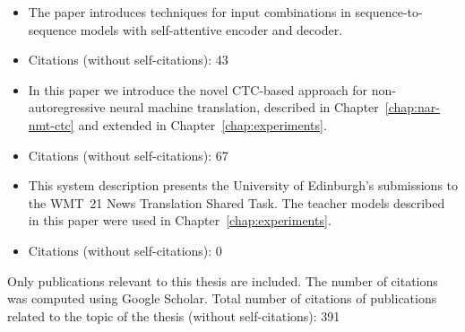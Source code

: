 \noindent{}
\begin{itemize}[noitemsep,topsep=0pt]

\item The paper introduces techniques for input combinations in
  sequence-to-sequence models with self-attentive encoder and decoder.

\item Citations (without self-citations): 43
\end{itemize}\vspace{3mm}

\noindent{}
\begin{itemize}[noitemsep,topsep=0pt]

\item In this paper we introduce the novel CTC-based approach for
  non-autoregressive neural machine translation, described in
  Chapter~\ref{chap:nar-nmt-ctc} and extended in
  Chapter~\ref{chap:experiments}.

\item Citations (without self-citations): 67
\end{itemize}\vspace{3mm}

\noindent{}
\begin{itemize}[noitemsep,topsep=0pt]

\item This system description presents the University of Edinburgh's
  submissions to the WMT~21 News Translation Shared Task. The teacher models
  described in this paper were used in Chapter~\ref{chap:experiments}.

\item Citations (without self-citations): 0 
\end{itemize}\vspace{3mm}

\vfill

\noindent Only publications relevant to this thesis are included. The number of
citations was computed using Google Scholar. Total number of citations of
publications related to the topic of the thesis (without self-citations):
{\large 391} %



